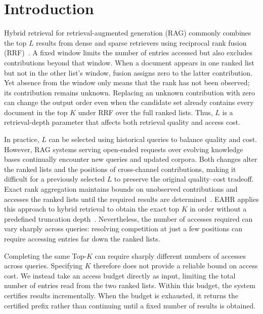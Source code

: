 \section{Introduction}

\label{sec:intro}

Hybrid retrieval for retrieval-augmented generation (RAG) commonly combines the top \(L\) results from dense and sparse retrievers using reciprocal rank fusion (RRF)~\cite{elastic,azure,rrf}. A fixed window limits the number of entries accessed but also excludes contributions beyond that window. When a document appears in one ranked list but not in the other list's window, fusion assigns zero to the latter contribution. Yet absence from the window only means that the rank has not been observed; its contribution remains unknown. Replacing an unknown contribution with zero can change the output order even when the candidate set already contains every document in the top \(K\) under RRF over the full ranked lists. Thus, \(L\) is a retrieval-depth parameter that affects both retrieval quality and access cost.

In practice, \(L\) can be selected using historical queries to balance quality and cost. However, RAG systems serving open-ended requests over evolving knowledge bases continually encounter new queries and updated corpora. Both changes alter the ranked lists and the positions of cross-channel contributions, making it difficult for a previously selected \(L\) to preserve the original quality--cost tradeoff. Exact rank aggregation maintains bounds on unobserved contributions and accesses the ranked lists until the required results are determined~\cite{nra}. EAHR applies this approach to hybrid retrieval to obtain the exact top \(K\) in order without a predefined truncation depth~\cite{eahr}. Nevertheless, the number of accesses required can vary sharply across queries: resolving competition at just a few positions can require accessing entries far down the ranked lists.

Completing the same Top-\(K\) can require sharply different numbers of accesses across queries. Specifying \(K\) therefore does not provide a reliable bound on access cost. We instead take an access budget directly as input, limiting the total number of entries read from the two ranked lists. Within this budget, the system certifies results incrementally. When the budget is exhausted, it returns the certified prefix rather than continuing until a fixed number of results is obtained.

